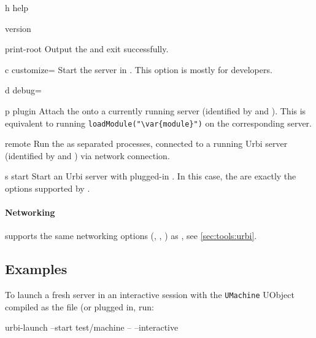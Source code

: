 \begin{options}
\item[h]{help} \optionHelp
\item{version} \optionVersion
\item{print-root} Output the  and exit successfully.
\item[c]{customize=} Start the \urbi server in
  .  This option is mostly for developers.
\item[d]{debug=} \optionDebug
\end{options}

\begin{options}
\item[p]{plugin} Attach the  onto a currently running \urbi
  server (identified by  and ).  This is equivalent to
  running \lstinline[style=varInString]|loadModule("\var{module}")| on the
  corresponding server.

\item[r]{remote} Run the  as separated processes,
  connected to a running Urbi server (identified by  and
  ) via network connection.

\item[s]{start} Start an Urbi server with plugged-in
  .  In this case, the  are exactly
  the options supported by .
\end{options}

\paragraph{Networking}
 supports the same networking options
(, , ) as
, see \autoref{sec:tools:urbi}.

\subsection{Examples}

To launch a fresh server in an interactive session with the
\lstinline|UMachine| UObject compiled as the file  (or
 plugged in, run:

\begin{shell}
urbi-launch --start test/machine -- --interactive
\end{shell}

